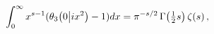 \[\int_{0}^{\infty}x^{s-1}(\mathop{\theta_{3}\/}\nolimits\!\left(0\middle|ix^{2}%
\right)-1)dx=\pi^{-s/2}\mathop{\Gamma\/}\nolimits\!\left(\tfrac{1}{2}s\right)%
\mathop{\zeta\/}\nolimits\!\left(s\right),\]
